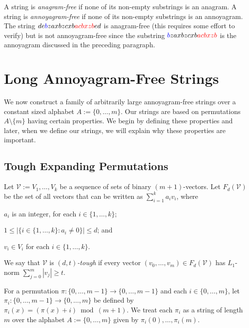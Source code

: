 \documentclass[kpfonts]{patmorin}
\newcommand{\colored}[2]{{\color{#1}#2}}
\begin{document}
A string is \emph{anagram-free} if none of its non-empty substrings is an anagram. A string is \emph{annoyagram-free} if none of its non-empty substrings is an annoyagram. The string $de\colored{blue}{b}zaxbzcxb\colored{red}{acbxzb}ed$ is anagram-free (this requires some effort to verify) but is not annoyagram-free since the substring $\colored{blue}{b}zaxbzcxb\colored{red}{acbxzb}$ is the annoyagram discussed in the preceding paragraph.

\section{Long Annoyagram-Free Strings}

We now construct a family of arbitrarily large annoyagram-free strings over a constant sized alphabet $A:=\{0,\ldots,m\}$.
Our strings are based on permutations $A\setminus\{m\}$ having certain properties.  We begin by defining these properties and later, when we define our strings, we will explain why these properties are important.

\subsection{Tough Expanding Permutations}
\label{permutations}

Let $\mathcal{V}:=V_1,\ldots,V_k$ be a sequence of sets of binary $(m+1)$-vectors.  Let $F_d(\mathcal{V})$ be the set of all vectors that can be written as $\sum_{i=1}^k a_iv_i$, where
\begin{compactenum}
    \item $a_i$ is an integer, for each $i\in\{1,\ldots,k\}$;
    \item $1\le |\{i\in\{1,\ldots,k\}:a_i\neq 0\}| \le d$; and
    \item $v_i\in V_i$ for each $i\in\{1,\ldots,k\}$.
\end{compactenum}
We say that $\mathcal{V}$ is \emph{$(d,t)$-tough} if every vector $(v_0,\ldots,v_m)\in F_d(\mathcal{V})$ has $L_1$-norm $\sum_{j=0}^m |v_j| \ge t$.

For a permutation $\pi:\{0,\ldots,m-1\}\to\{0,\ldots,m-1\}$ and each $i\in\{0,\ldots,m\}$, let $\pi_i:\{0,\ldots,m-1\}\to\{0,\ldots,m\}$ be defined by $\pi_i(x)=(\pi(x)+i)\bmod (m+1)$.  We treat each $\pi_i$ as a string of length $m$ over the alphabet $A:=\{0,\ldots,m\}$ given by $\pi_i(0),\ldots,\pi_i(m)$.
\end{document}
